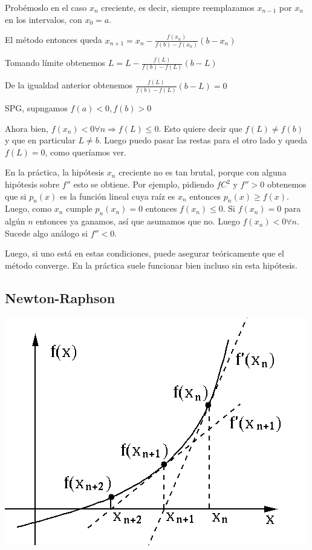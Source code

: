 \documentclass[10pt,a4paper,final]{report}
\begin{document}
{Probémoslo en el caso $x_n$ creciente, es decir, siempre reemplazamos $x_{n-1}$ por $x_n$ en los intervalos, con $x_0=a$.

El método entonces queda $x_{n+1} = x_n - \frac{f(x_n)}{f(b)-f(x_n)}(b-x_n)$

Tomando límite obtenemos $L = L - \frac{f(L)}{f(b)-f(L)}(b-L)$

De la igualdad anterior obtenemos $\frac{f(L)}{f(b)-f(L)}(b-L)=0$

SPG, supngamos $f(a)<0, f(b)>0$

Ahora bien, $f(x_n)<0 \forall n \Rightarrow f(L) \leq 0$. Esto quiere decir que $f(L) \neq f(b)$ y que en particular $L\neq b$. Luego puedo pasar las restas para el otro lado y queda $f(L) = 0$, como queríamos ver.


En la práctica, la hipótesis $x_n$ creciente no es tan brutal, porque con alguna hipótesis sobre $f''$ esto se obtiene. Por ejemplo, pidiendo $f C^2$ y $f''>0$ obtenemos que si $p_n(x)$ es la función lineal cuya raíz es $x_n$ entonces $p_n(x) \geq f(x)$. Luego, como $x_n$ cumple $p_n(x_n)=0$ entonces $f(x_n)\leq 0$. Si $f(x_n)=0$ para algún $n$ entonces ya ganamos, así que asumamos que no. Luego $f(x_n) < 0 \forall n$. Sucede algo análogo si $f''<0$.

Luego, si uno está en estas condiciones, puede asegurar teóricamente que el método converge. En la práctica suele funcionar bien incluso sin esta hipótesis.


\subsection{Newton-Raphson}

\includegraphics[scale=0.5]{newton_raphson.png}

}
\end{document}
